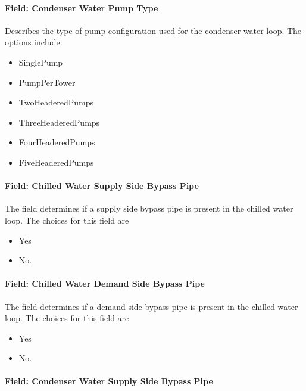\paragraph{Field: Condenser Water Pump Type}\label{field-condenser-water-pump-type}

Describes the type of pump configuration used for the condenser water loop. The options include:

\begin{itemize}
\item
  SinglePump
\item
  PumpPerTower
\item
  TwoHeaderedPumps
\item
  ThreeHeaderedPumps
\item
  FourHeaderedPumps
\item
  FiveHeaderedPumps
\end{itemize}

\paragraph{Field: Chilled Water Supply Side Bypass Pipe}\label{field-chilled-water-supply-side-bypass-pipe}

The field determines if a supply side bypass pipe is present in the chilled water loop. The choices for this field are

\begin{itemize}
\item
  Yes
\item
  No.
\end{itemize}

\paragraph{Field: Chilled Water Demand Side Bypass Pipe}\label{field-chilled-water-demand-side-bypass-pipe}

The field determines if a demand side bypass pipe is present in the chilled water loop. The choices for this field are

\begin{itemize}
\item
  Yes
\item
  No.
\end{itemize}

\paragraph{Field: Condenser Water Supply Side Bypass Pipe}\label{field-condenser-water-supply-side-bypass-pipe}

